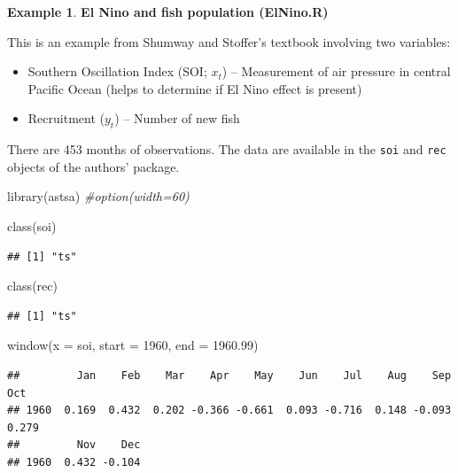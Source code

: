 \documentclass[
]{book}
\newenvironment{Shaded}{\begin{snugshade}}{\end{snugshade}}
\newcommand{\AttributeTok}[1]{\textcolor[rgb]{0.77,0.63,0.00}{#1}}
\newcommand{\CommentTok}[1]{\textcolor[rgb]{0.56,0.35,0.01}{\textit{#1}}}
\newcommand{\DecValTok}[1]{\textcolor[rgb]{0.00,0.00,0.81}{#1}}
\newcommand{\FloatTok}[1]{\textcolor[rgb]{0.00,0.00,0.81}{#1}}
\newcommand{\FunctionTok}[1]{\textcolor[rgb]{0.00,0.00,0.00}{#1}}
\newcommand{\NormalTok}[1]{#1}
\providecommand{\tightlist}{%
  \setlength{\itemsep}{0pt}\setlength{\parskip}{0pt}}
\theoremstyle{definition}
\theoremstyle{definition}
\newtheorem{example}{Example}[chapter]
\theoremstyle{definition}
\theoremstyle{definition}
\theoremstyle{remark}
\begin{document}
\begin{example}
\textbf{El Nino and fish population (ElNino.R)}

This is an example from Shumway and Stoffer's textbook involving two variables:

\begin{itemize}
\tightlist
\item
  Southern Oscillation Index (SOI; \(x_t\)) -- Measurement of air pressure in central Pacific Ocean (helps to determine if El Nino effect is present)
\item
  Recruitment (\(y_t\)) -- Number of new fish
\end{itemize}

There are 453 months of observations. The data are available in the \texttt{soi} and \texttt{rec} objects of the authors' package.

\begin{Shaded}
\begin{Highlighting}[]
\FunctionTok{library}\NormalTok{(astsa)}
\CommentTok{\#option(width=60)}

\FunctionTok{class}\NormalTok{(soi)}
\end{Highlighting}
\end{Shaded}

\begin{verbatim}
## [1] "ts"
\end{verbatim}

\begin{Shaded}
\begin{Highlighting}[]
\FunctionTok{class}\NormalTok{(rec)}
\end{Highlighting}
\end{Shaded}

\begin{verbatim}
## [1] "ts"
\end{verbatim}

\begin{Shaded}
\begin{Highlighting}[]
\FunctionTok{window}\NormalTok{(}\AttributeTok{x =}\NormalTok{ soi, }\AttributeTok{start =} \DecValTok{1960}\NormalTok{, }\AttributeTok{end =} \FloatTok{1960.99}\NormalTok{)}
\end{Highlighting}
\end{Shaded}

\begin{verbatim}
##         Jan    Feb    Mar    Apr    May    Jun    Jul    Aug    Sep    Oct
## 1960  0.169  0.432  0.202 -0.366 -0.661  0.093 -0.716  0.148 -0.093  0.279
##         Nov    Dec
## 1960  0.432 -0.104
\end{verbatim}


\end{example}
\end{document}
